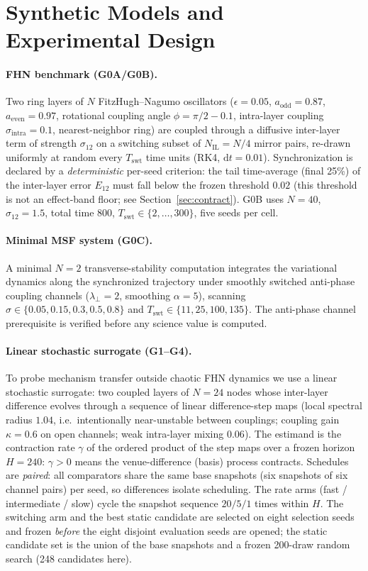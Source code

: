 \documentclass[11pt]{article}
\newcommand{\Tswt}{T_{\mathrm{swt}}}
\newcommand{\NIL}{N_{\mathrm{IL}}}
\begin{document}
\section{Synthetic Models and Experimental Design}
\label{sec:design}

\paragraph{FHN benchmark (G0A/G0B).}
Two ring layers of $N$ FitzHugh--Nagumo oscillators
($\epsilon=0.05$, $a_{\mathrm{odd}}=0.87$, $a_{\mathrm{even}}=0.97$, rotational
coupling angle $\phi=\pi/2-0.1$, intra-layer coupling $\sigma_{\mathrm{intra}}=0.1$,
nearest-neighbor ring) are coupled through a diffusive inter-layer term of
strength $\sigma_{12}$ on a switching subset of $\NIL=N/4$ mirror pairs,
re-drawn uniformly at random every $\Tswt$ time units (RK4, $\mathrm{d}t=0.01$).
Synchronization is declared by a \emph{deterministic} per-seed criterion: the
tail time-average (final 25\%) of the inter-layer error $E_{12}$ must fall
below the frozen threshold $0.02$ (this threshold is not an effect-band floor;
see Section~\ref{sec:contract}). G0B uses $N=40$, $\sigma_{12}=1.5$, total time $800$,
$\Tswt\in\{2,\dots,300\}$, five seeds per cell.

\paragraph{Minimal MSF system (G0C).}
A minimal $N=2$ transverse-stability computation integrates the variational
dynamics along the synchronized trajectory under smoothly switched anti-phase
coupling channels ($\lambda_\perp=2$, smoothing $\alpha=5$), scanning
$\sigma\in\{0.05,0.15,0.3,0.5,0.8\}$ and $\Tswt\in\{11,25,100,135\}$. The
anti-phase channel prerequisite is verified before any science value is
computed.

\paragraph{Linear stochastic surrogate (G1--G4).}
To probe mechanism transfer outside chaotic FHN dynamics we use a linear
stochastic surrogate: two coupled layers of $N=24$ nodes whose inter-layer
difference evolves through a sequence of linear difference-step maps
(local spectral radius $1.04$, i.e.\ intentionally near-unstable between
couplings; coupling gain $\kappa=0.6$ on open channels; weak intra-layer
mixing $0.06$). The estimand is the contraction rate $\gamma$ of the ordered
product of the step maps over a frozen horizon $H=240$: $\gamma>0$ means the
venue-difference (basis) process contracts. Schedules are \emph{paired}: all
comparators share the same base snapshots (six snapshots of six channel pairs)
per seed, so differences isolate scheduling. The rate arms (fast /
intermediate / slow) cycle the snapshot sequence $20/5/1$ times within $H$.
The switching arm and the best static candidate are selected on eight
selection seeds and frozen \emph{before} the eight disjoint evaluation seeds
are opened; the static candidate set is the union of the base snapshots and a
frozen 200-draw random search (248 candidates here).
\end{document}
